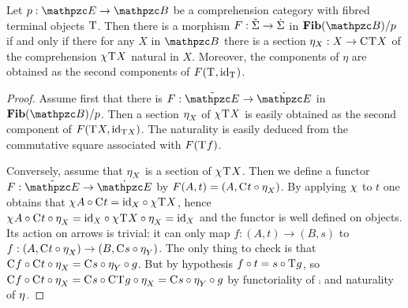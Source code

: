 \documentclass{lmcs} %
\theoremstyle{plain}\newtheorem{satz}[thm]{Satz} %
\begin{document}
			\begin{lem}\label{lem:term-pres}
				Let $p:\ct{E}\to\ct{B}$ be a comprehension category with fibred terminal objects $\mathrm{T}^{}$. Then there is a morphism $F:\tilde{\Sigma}\to\dot{\Sigma}$ in $\Fib(\ct{B})/p$ if and only if there for any $X$ in $\ct{B}$ there is a section $\eta_X:X\to\mathrm{C}^{}\mathrm{T}^{}X$ of the comprehension $\chi^{}\mathrm{T}^{}X$ natural in $X$.
				Moreover, the components of $\eta$ are obtained as the second components of $F(\mathrm{T}^{}, \mathrm{id}_{\mathrm{T}^{}})$.
			\end{lem}
			
			\begin{proof}
				Assume first that there is $F:\gtcat{\ct{E}}\to\tcat{\ct{E}}$ in $\Fib(\ct{B})/p$. Then a section $\mathrm{\eta}^{}_X$ of $\chi^{}\mathrm{T}^{}X$ is easily obtained as the second component of $F(\mathrm{T}^{}X, \mathrm{id}_{\mathrm{T}^{}X})$. The naturality is easily deduced from the commutative square associated with $F(\mathrm{T}^{}f)$.
				
				Conversely, assume that $\mathrm{\eta}^{}_X$ is a section of $\chi^{}\mathrm{T}^{}X$. Then we define a functor $F:\gtcat{\ct{E}}\to\tcat{\ct{E}}$ by $F(A,t)=(A,\mathrm{C}^{}t\circ\mathrm{\eta}^{}_X)$. By applying $\chi^{}$ to $t$ one obtains that $\chi^{}A\circ\mathrm{C}^{}t=\mathrm{id}_{X}\circ\chi^{}\mathrm{T}^{}X$, hence $\chi^{}A\circ\mathrm{C}^{}t\circ\mathrm{\eta}^{}_X=\mathrm{id}_{X}\circ\chi^{}\mathrm{T}^{}X\circ\mathrm{\eta}^{}_X=\mathrm{id}_{X}$ and the functor is well defined on objects. Its action on arrows is trivial: it can only map $f:(A,t)\to(B,s)$ to $f:(A,\mathrm{C}^{}t\circ\mathrm{\eta}^{}_X)\to(B,\mathrm{C}^{}s\circ\mathrm{\eta}^{}_Y)$. The only thing to check is that $\mathrm{C}^{}f\circ\mathrm{C}^{}t\circ\mathrm{\eta}^{}_X=\mathrm{C}^{}s\circ\mathrm{\eta}^{}_Y\circ g$. But by hypothesis $f\circ t=s\circ\mathrm{T}^{}g$, so $\mathrm{C}^{}f\circ\mathrm{C}^{}t\circ\mathrm{\eta}^{}_X=\mathrm{C}^{}s\circ\mathrm{C}^{}\mathrm{T}^{}g\circ\mathrm{\eta}^{}_X=\mathrm{C}^{}s\circ\mathrm{\eta}^{}_Y\circ g$ by functoriality of $\comp{}$ and naturality of $\mathrm{\eta}^{}$.
			\end{proof}
			
			
			
\end{document}
